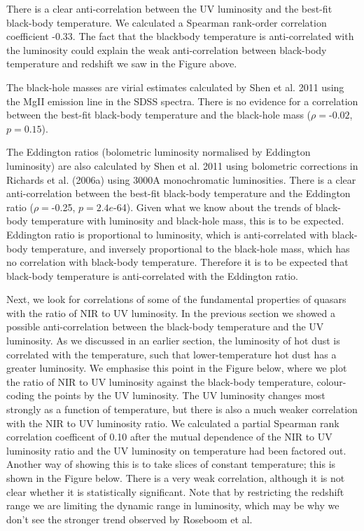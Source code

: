 There is a clear anti-correlation between the UV luminosity and the best-fit black-body temperature. We calculated a Spearman rank-order correlation coefficient -0.33. The fact that the blackbody temperature is anti-correlated with the luminosity could explain the weak anti-correlation between black-body temperature and redshift we saw in the Figure above. 

The black-hole masses are virial estimates calculated by Shen et al. 2011 using the MgII emission line in the SDSS spectra. There is no evidence for a correlation between the best-fit black-body temperature and the black-hole mass ($\rho=$-$0.02$, $p=0.15$).  

The Eddington ratios (bolometric luminosity normalised by Eddington luminosity) are also calculated by Shen et al. 2011 using bolometric corrections in Richards et al. (2006a) using 3000A monochromatic luminosities. There is a clear anti-correlation between the best-fit black-body temperature and the Eddington ratio ($\rho=$-0.25, $p=2.4e$-64). Given what we know about the trends of black-body temperature with luminosity and black-hole mass, this is to be expected. Eddington ratio is proportional to luminosity, which is anti-correlated with black-body temperature, and inversely proportional to the black-hole mass, which has no correlation with black-body temperature. Therefore it is to be expected that black-body temperature is anti-correlated with the Eddington ratio. 

Next, we look for correlations of some of the fundamental properties of quasars with the ratio of NIR to UV luminosity. In the previous section we showed a possible anti-correlation between the black-body temperature and the UV luminosity. As we discussed in an earlier section, the luminosity of hot dust is correlated with the temperature, such that lower-temperature hot dust has a greater luminosity. We emphasise this point in the Figure below, where we plot the ratio of NIR to UV luminosity against the black-body temperature, colour-coding the points by the UV luminosity. The UV luminosity changes most strongly as a function of temperature, but there is also a much weaker correlation with the NIR to UV luminosity ratio. We calculated a partial Spearman rank correlation coefficent of 0.10 after the mutual dependence of the NIR to UV luminosity ratio and the UV luminosity on temperature had been factored out. Another way of showing this is to take slices of constant temperature; this is shown in the Figure below. There is a very weak correlation, although it is not clear whether it is statistically significant. Note that by restricting the redshift range we are limiting the dynamic range in luminosity, which may be why we don't see the stronger trend observed by Roseboom et al. 





